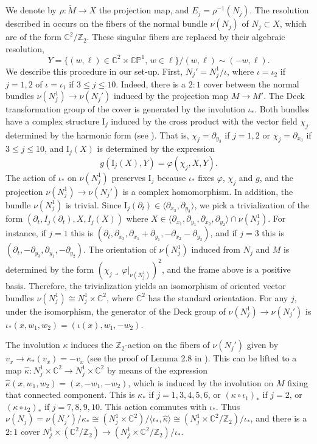 \documentclass[10pt]{article}
\newcommand{\C}{\mathbb C}
\newcommand{\Z}{\mathbb Z}
\newcommand{\la}{\langle}
\newcommand{\ra}{\rangle}
\newcommand{\ZZ}{\mathbb{Z}}
\newcommand{\CC}{\mathbb{C}}
\newcommand{\CP}{\mathbb{CP}}
\newcommand{\hook}{\lrcorner\,}
\theoremstyle{plain}
\theoremstyle{definition}
\theoremstyle{remark}
\begin{document}
We denote by $\rho \colon \widetilde{M} \to X$ the projection map, and $E_j= \rho^{-1}(N_j)$. The resolution described in \cite{JK} occurs on the fibers of the normal bundle $\nu(N_j)$ of $N_j\subset X$, which are of the form $\C^2/\Z_2$. These singular fibers are replaced by their algebraic resolution,
$$
Y=\{ (w,\ell)\in \C^2\times \CP^1, \, w\in \ell \}/(w,\ell)\sim (-w,\ell).
$$
We describe this procedure in our set-up.  First, 
$N_j'=N_j^1/\iota$, where $\iota=\iota_2$ if $j=1,2$ of $\iota=\iota_1$ if $3\leq j \leq 10$. Indeed,
there is a $2:1$ cover between the normal bundles
$\nu(N_j^1) \to \nu(N_j')$ induced by the projection map $M \to M'$. The Deck transformation group of the cover is generated by the involution $\iota_*$. Both bundles have a complex structure $\mathrm{I}_j$ induced by the cross product with the vector field $\chi_j$ determined  by the harmonic form (see \cite[Remark 4.1]{JK}). That is,
 $\chi_j=\partial_{y_3}$ if $j=1,2$ or $\chi_j=\partial_{x_3}$ if $3\leq j \leq 10$, and $\mathrm{I}_j(X)$ is determined by the expression
$$
g(\mathrm{I}_j(X),Y)=\varphi(\chi_j,X,Y)
.
$$
The action of $\iota_*$ on $\nu(N_j^1)$ preserves $\mathrm{I}_j$ because $\iota_*$ fixes $\varphi$, $\chi_j$ and $g$, and the projection $\nu(N_j^1) \to \nu(N_j')$ is a complex homomorphism.
In addition, the bundle $\nu(N_j^1)$ is trivial. Since $\mathrm{I}_j(\partial_t)\in \la  \partial_{x_3} ,\partial_{y_3}  \ra$,  we pick a trivialization of the form $(\partial_t, I_j(\partial_t), X,I_j(X))$ where $X\in \la \partial_{x_1},\partial_{y_1}, \partial_{x_2} ,\partial_{y_2}  \ra \cap \nu(N_j^1)$. For instance,  if $j=1$ this is $(\partial_t, \partial_{x_3}, \partial_{x_1}+ \partial_{y_1}, -\partial_{x_2}- \partial_{y_2})$, and if $j=3$ this is $(\partial_t, -\partial_{y_3}, \partial_{y_1}, -\partial_{y_2})$. The orientation of $\nu(N_j^1)$ induced from $N_j$ and $M$ is determined by the form $(\chi_j \hook\varphi|_{\nu(N_j^1)})^2$, and the frame above is a positive basis. Therefore, the trivialization yields an isomorphism of oriented vector bundles $\nu(N_j^1)\cong N_j^1\times \C^2$, where $\C^2$ has the standard orientation.  For any $j$, under the isomorphism, the generator of the Deck group of $\nu(N_j^1) \to \nu(N_j')$ is $\iota_*(x,w_1,w_2)=(\iota(x),w_1,-w_2)$. 

The involution $\kappa$ induces the $\Z_2$-action on the fibers of $\nu(N_j')$ given by $v_x \to \kappa_*(v_x)=-v_x$ (see the proof of Lemma 2.8 in \cite{LMM}).
This  can be lifted to a map $\hat{\kappa} \colon N_j^1\times \CC^2 \to N_j^1\times \CC^2$ by means of the expression $\hat{\kappa}(x,w_1,w_2)= (x,-w_1,-w_2)$, which is induced by the involution on $M$ fixing that connected component. This is $\kappa_*$ if $j=1,3,4,5,6$, or $(\kappa\circ \iota_1)_*$ if $j=2$, or $(\kappa\circ \iota_2)_*$ if $j=7,8,9,10$. This action commutes with $\iota_*$. Thus $\nu(N_j)=\nu(N_j')/\kappa_*\cong (N_j^1 \times \CC^2)/\la \iota_*, \hat{\kappa} \ra \cong (N_j^1 \times \CC^2/\ZZ_2)/\iota_*$, and 
there is a $2:1$ cover $N_j^1\times (\C^2/\Z_2) \to (N_j^1\times \C^2/\ZZ_2)/ \iota_*$.
\end{document}
